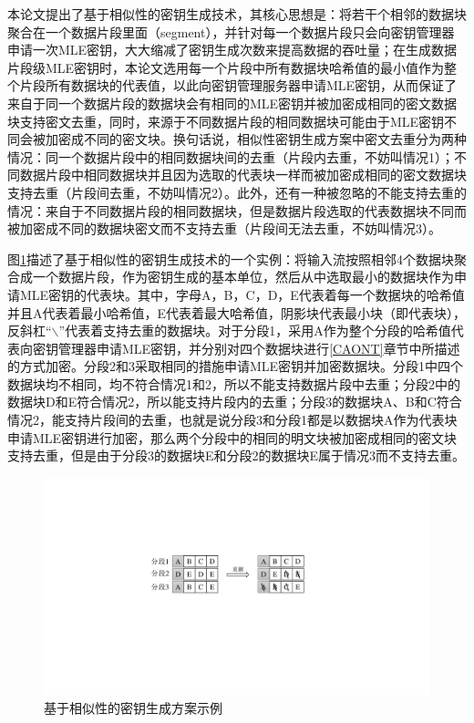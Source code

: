 \documentclass[promaster]{thesis-uestc}
\begin{document}

本论文提出了基于相似性的密钥生成技术，其核心思想是：将若干个相邻的数据块聚合在一个数据片段里面（segment），并针对每一个数据片段只会向密钥管理器申请一次MLE密钥，大大缩减了密钥生成次数来提高数据的吞吐量；在生成数据片段级MLE密钥时，本论文选用每一个片段中所有数据块哈希值的最小值作为整个片段所有数据块的代表值，以此向密钥管理服务器申请MLE密钥，从而保证了来自于同一个数据片段的数据块会有相同的MLE密钥并被加密成相同的密文数据块支持密文去重，同时，来源于不同数据片段的相同数据块可能由于MLE密钥不同会被加密成不同的密文块。换句话说，相似性密钥生成方案中密文去重分为两种情况：同一个数据片段中的相同数据块间的去重（片段内去重，不妨叫情况1）；不同数据片段中相同数据块并且因为选取的代表块一样而被加密成相同的密文数据块支持去重（片段间去重，不妨叫情况2）。此外，还有一种被忽略的不能支持去重的情况：来自于不同数据片段的相同数据块，但是数据片段选取的代表数据块不同而被加密成不同的数据块密文而不支持去重（片段间无法去重，不妨叫情况3）。

图\ref{基于相似性的密钥生成方案示例}描述了基于相似性的密钥生成技术的一个实例：将输入流按照相邻4个数据块聚合成一个数据片段，作为密钥生成的基本单位，然后从中选取最小的数据块作为申请MLE密钥的代表块。其中，字母A，B，C，D，E代表着每一个数据块的哈希值并且A代表着最小哈希值，E代表着最大哈希值，阴影块代表最小块（即代表块），反斜杠“$\backslash$”代表着支持去重的数据块。对于分段1，采用A作为整个分段的哈希值代表向密钥管理器申请MLE密钥，并分别对四个数据块进行\ref{CAONT}章节中所描述的方式加密。分段2和3采取相同的措施申请MLE密钥并加密数据块。分段1中四个数据块均不相同，均不符合情况1和2，所以不能支持数据片段中去重；分段2中的数据块D和E符合情况2，所以能支持片段内的去重；分段3的数据块A、B和C符合情况2，能支持片段间的去重，也就是说分段3和分段1都是以数据块A作为代表块申请MLE密钥进行加密，那么两个分段中的相同的明文块被加密成相同的密文块支持去重，但是由于分段3的数据块E和分段2的数据块E属于情况3而不支持去重。
\begin{figure}[htbp]
    \centering
    \includegraphics[width = 0.6\linewidth]{pic/相似性密钥生成方案.pdf}
    \caption{基于相似性的密钥生成方案示例}
    \label{基于相似性的密钥生成方案示例}
\end{figure}
\end{document}

